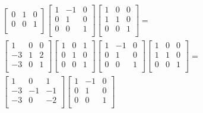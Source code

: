 \documentclass[12pt]{article}
\begin{document}
\begin{enumerate}
\begin{align*}
\begin{bmatrix}
        0 &  1 & 0\\
        0 &  0 & 1\\
      \end{bmatrix}
      \begin{bmatrix}
        1 & -1 & 0\\
        0 &  1 & 0\\
        0 &  0 & 1\\
      \end{bmatrix}
      \begin{bmatrix}
        1 &  0 & 0\\
        1 &  1 & 0\\
        0 &  0 & 1\\
      \end{bmatrix} =\\
      \begin{bmatrix}
         1 &  0 & 0\\
        -3 &  1 & 2\\
        -3 &  0 & 1\\
      \end{bmatrix}
      \begin{bmatrix}
        1 &  0 & 1\\
        0 &  1 & 0\\
        0 &  0 & 1\\
      \end{bmatrix}
      \begin{bmatrix}
        1 & -1 & 0\\
        0 &  1 & 0\\
        0 &  0 & 1\\
      \end{bmatrix}
      \begin{bmatrix}
        1 &  0 & 0\\
        1 &  1 & 0\\
        0 &  0 & 1\\
      \end{bmatrix} =\\
      \begin{bmatrix}
         1 &  0 &  1\\
        -3 & -1 & -1\\
        -3 &  0 & -2\\
      \end{bmatrix}
      \begin{bmatrix}
        1 & -1 & 0\\
        0 &  1 & 0\\
        0 &  0 & 1\\

\end{bmatrix}
\end{align*}
\end{enumerate}
\end{document}
